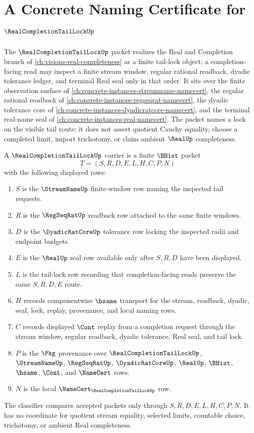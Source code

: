 \chapter{A Concrete Naming Certificate for $\RealCompletionTailLockUp$}
\label{ch:concrete-instances-real-completion-tail-lock-namecert}

The $\RealCompletionTailLockUp$ packet realizes the Real and Completion branch of \autoref{ch:visions-real-completeness} as a finite tail-lock object: a completion-facing read may inspect a finite stream window, regular rational readback, dyadic tolerance ledger, and terminal Real seal only in that order. It sits over the finite observation surface of \autoref{ch:concrete-instances-streamname-namecert}, the regular rational readback of \autoref{ch:concrete-instances-regseqrat-namecert}, the dyadic tolerance core of \autoref{ch:concrete-instances-dyadicratcore-namecert}, and the terminal real-name seal of \autoref{ch:concrete-instances-real-namecert}. The packet names a lock on the visible tail route; it does not assert quotient Cauchy equality, choose a completed limit, import trichotomy, or claim ambient $\RealUp$ completeness.

\begin{definition}
\label{def:real-completion-tail-lock-carrier}
A $\RealCompletionTailLockUp$ carrier is a finite $\BHist$ packet
$$
T=(S,R,D,E,L,H,C,P,N)
$$
with the following displayed rows:
\begin{enumerate}
\item $S$ is the $\StreamNameUp$ finite-window row naming the inspected tail requests.
\item $R$ is the $\RegSeqRatUp$ readback row attached to the same finite windows.
\item $D$ is the $\DyadicRatCoreUp$ tolerance row locking the inspected radii and endpoint budgets.
\item $E$ is the $\RealUp$ seal row available only after $S,R,D$ have been displayed.
\item $L$ is the tail-lock row recording that completion-facing reads preserve the same $S,R,D,E$ route.
\item $H$ records componentwise $\hsame$ transport for the stream, readback, dyadic, seal, lock, replay, provenance, and local naming rows.
\item $C$ records displayed $\Cont$ replay from a completion request through the stream window, regular readback, dyadic tolerance, Real seal, and tail lock.
\item $P$ is the $\Pkg$ provenance over $\RealCompletionTailLockUp$, $\StreamNameUp$, $\RegSeqRatUp$, $\DyadicRatCoreUp$, $\RealUp$, $\BHist$, $\hsame$, $\Cont$, and $\NameCert$ rows.
\item $N$ is the local $\NameCert_{\RealCompletionTailLockUp}$ row.
\end{enumerate}
The classifier compares accepted packets only through $S,R,D,E,L,H,C,P,N$. It has no coordinate for quotient stream equality, selected limits, countable choice, trichotomy, or ambient Real completeness.
\end{definition}

